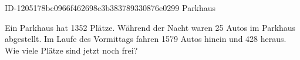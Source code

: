 \begin{exercise}
      {ID-1205178bc0966f462698c3b383789330876e0299}
      {Parkhaus}
  \ifproblem\problem\par
    Ein Parkhaus hat \num{1352} Plätze. Während der Nacht waren 25 Autos im Parkhaus
    abgestellt. Im Laufe des Vormittags fahren \num{1579} Autos hinein und 428 heraus.
    Wie viele Plätze sind jetzt noch frei?
  \fi
\end{exercise}
